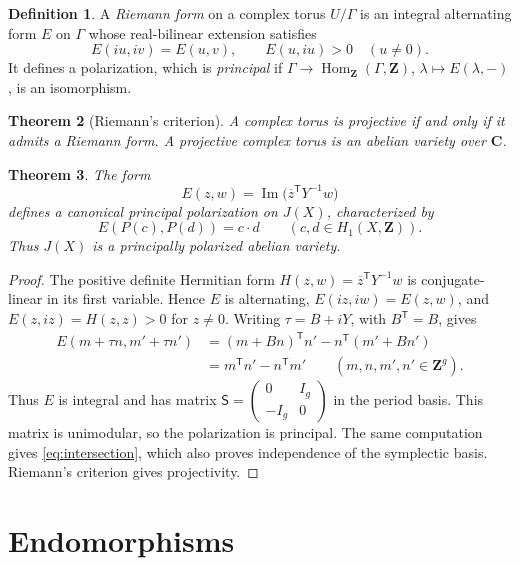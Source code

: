 \documentclass[11pt]{article}
\numberwithin{equation}{section}
\newtheorem{theorem}{Theorem}[section]
\theoremstyle{definition}
\newtheorem{definition}[theorem]{Definition}
\newcommand{\Z}{\mathbf Z}
\newcommand{\C}{\mathbf C}
\newcommand{\Hom}{\operatorname{Hom}}
\newcommand{\trans}{\mathsf T}
\begin{document}
\begin{definition}
A \emph{Riemann form} on a complex torus $U/\Gamma$ is an integral
alternating form $E$ on $\Gamma$ whose real-bilinear extension satisfies
\[
 E(iu,iv)=E(u,v),\qquad E(u,iu)>0\quad(u\neq0).
\]
It defines a polarization, which is \emph{principal} if
$\Gamma\to\Hom_{\Z}(\Gamma,\Z)$, $\lambda\mapsto E(\lambda,-)$,
is an isomorphism.
\end{definition}

\begin{theorem}[Riemann's criterion]
A complex torus is projective if and only if it admits a Riemann form.
A projective complex torus is an abelian variety over $\C$.
\end{theorem}

\begin{theorem}\label{thm:polarization}
The form
\[
 E(z,w)=\operatorname{Im}\bigl(\overline z^{\trans}Y^{-1}w\bigr)
\]
defines a canonical principal polarization on $J(X)$, characterized by
\begin{equation}\label{eq:intersection}
 E(P(c),P(d))=c\cdot d\qquad(c,d\in H_1(X,\Z)).
\end{equation}
Thus $J(X)$ is a principally polarized abelian variety.
\end{theorem}

\begin{proof}
The positive definite Hermitian form
$H(z,w)=\overline z^{\trans}Y^{-1}w$ is conjugate-linear in its first
variable. Hence $E$ is alternating, $E(iz,iw)=E(z,w)$, and
$E(z,iz)=H(z,z)>0$ for $z\neq0$. Writing $\tau=B+iY$, with
$B^{\trans}=B$, gives
\begin{align*}
 E(m+\tau n,m'+\tau n')
 &=(m+Bn)^{\trans}n'-n^{\trans}(m'+Bn')\\
 &=m^{\trans}n'-n^{\trans}m'
 \qquad(m,n,m',n'\in\Z^g).
\end{align*}
Thus $E$ is integral and has matrix
$\mathsf S=\left(\begin{smallmatrix}0&I_g\\-I_g&0\end{smallmatrix}\right)$
in the period basis. This matrix is unimodular, so the polarization is
principal. The same computation gives \eqref{eq:intersection}, which
also proves independence of the symplectic basis. Riemann's criterion
gives projectivity.
\end{proof}

\section{Endomorphisms}
\end{document}
